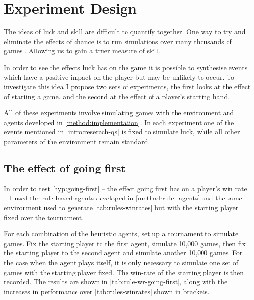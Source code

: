 \documentclass[../main.tex]{subfiles}
\begin{document}
\section{Experiment Design} \label{method:experiments}


The ideas of luck and skill are difficult to quantify together. One way to try and eliminate the effects of chance is to run simulations over many thousands of games \cite{guo_distinguishing_2019}. Allowing us to gain a truer measure of skill. 

In order to see the effects luck has on the game it is possible to synthesise events which have a positive impact on the player but may be unlikely to occur. To investigate this idea I propose two sets of experiments, the first looks at the effect of starting a game, and the second at the effect of a player's starting hand.


All of these experiments involve simulating games with the environment and agents developed in \cref{method:implementation}. In each experiment one of the events mentioned in \cref{intro:reserach-qs} is fixed to simulate luck, while all other parameters of the environment remain standard. 

\subsection{The effect of going first} \label{method:going-first}
In order to test \cref{hyp:going-first} -- the effect going first has on a player's win rate -- I used the rule based agents developed in \cref{method:rule_agents} and the same environment used to generate \cref{tab:rules-winrates} but with the starting player fixed over the tournament.

For each combination of the heuristic agents, set up a tournament to simulate games. Fix the starting player to the first agent, simulate 10,000 games, then fix the starting player to the second agent and simulate another 10,000 games. For the case when the agent plays itself, it is only necessary to simulate one set of games with the starting player fixed. The win-rate of the starting player is then recorded. The results are shown in \cref{tab:rule-wr-going-first}, along with the increases in performance over \cref{tab:rules-winrates} shown in brackets.
\end{document}

